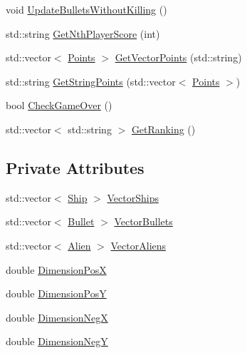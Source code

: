 \begin{DoxyCompactItemize}
\item 
void \hyperlink{classBoard_a24528a3e4b4ec51af758b5852508b491}{Update\-Bullets\-Without\-Killing} ()
\item 
std\-::string \hyperlink{classBoard_ac23c3d4b4895b5de1c255e5126cc1005}{Get\-Nth\-Player\-Score} (int)
\item 
std\-::vector$<$ \hyperlink{structPoints}{Points} $>$ \hyperlink{classBoard_a62f321cf4157cd8d0e601bbd541cc637}{Get\-Vector\-Points} (std\-::string)
\item 
std\-::string \hyperlink{classBoard_a09a953d90a345ec7c373cc3efc0572f6}{Get\-String\-Points} (std\-::vector$<$ \hyperlink{structPoints}{Points} $>$)
\item 
bool \hyperlink{classBoard_ae656233bce0aca3e6a11364f06f02d8d}{Check\-Game\-Over} ()
\item 
std\-::vector$<$ std\-::string $>$ \hyperlink{classBoard_a7f68a37c2fcc340b6c96ccd814302cb8}{Get\-Ranking} ()
\end{DoxyCompactItemize}
\subsection*{Private Attributes}
\begin{DoxyCompactItemize}
\item 
std\-::vector$<$ \hyperlink{classShip}{Ship} $>$ \hyperlink{classBoard_a18dfdb96f49cf35d7bd480b22ca232b4}{Vector\-Ships}
\item 
std\-::vector$<$ \hyperlink{classBullet}{Bullet} $>$ \hyperlink{classBoard_a2dc362255acf464278a688d03c7d0756}{Vector\-Bullets}
\item 
std\-::vector$<$ \hyperlink{classAlien}{Alien} $>$ \hyperlink{classBoard_a8314122d17536c280bebf1c015522175}{Vector\-Aliens}
\item 
double \hyperlink{classBoard_ac704686efaa5a36464d53fb7cf4275bc}{Dimension\-Pos\-X}
\item 
double \hyperlink{classBoard_abb6a7d3b83b0bba5e8b93ad3c4446777}{Dimension\-Pos\-Y}
\item 
double \hyperlink{classBoard_a405af5d01cf8db9e6c08b26c840b1087}{Dimension\-Neg\-X}
\item 
double \hyperlink{classBoard_a996f58b7d1c0083ebbcc03ffdbb8e1b1}{Dimension\-Neg\-Y}
\end{DoxyCompactItemize}


